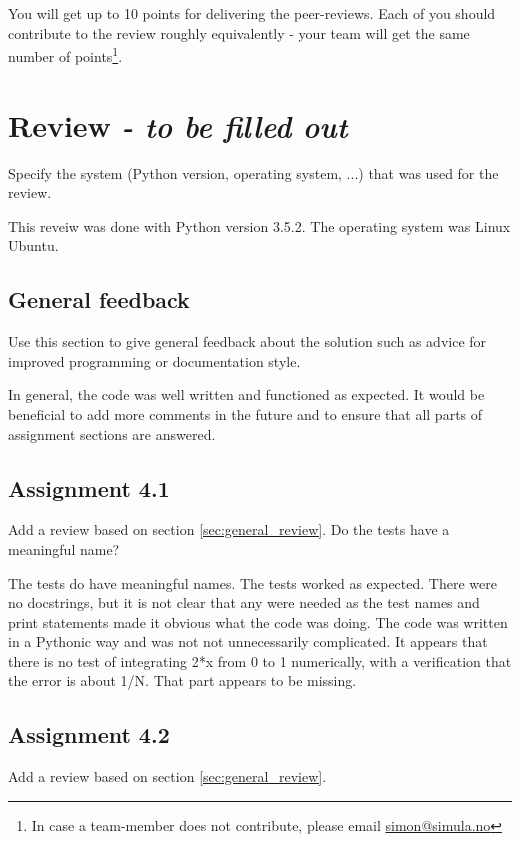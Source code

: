 \documentclass[a4paper]{article}
\begin{document}
You will get up to 10 points for delivering the peer-reviews. Each of you should contribute to the review roughly equivalently - your team will get the same number of points\footnote{In case a team-member does not contribute, please email \href{mailto:simon@simula.no}{simon@simula.no}}. 



\section{Review \emph{- to be filled out}}\label{sec:review}

Specify the system (Python version, operating system, ...) that was used for the review.
\bigskip

This reveiw was done with Python version 3.5.2. The operating system was Linux Ubuntu.
\subsection*{General feedback}
Use this section to give general feedback about the solution such as advice for improved programming or documentation style.
\bigskip

In general, the code was well written and functioned as expected. It would be beneficial to add more comments in the future and to ensure that all parts of assignment sections are answered.

\subsection*{Assignment 4.1}
Add a review based on section \ref{sec:general_review}. Do the tests have a meaningful name?
\bigskip

The tests do have meaningful names. The tests worked as expected. There were no docstrings, but it is not clear that any were needed as the test names and print statements made it obvious what the code was doing. The code was written in a Pythonic way and was not not unnecessarily complicated. It appears that there is no test of integrating 2*x from 0 to 1 numerically, with a verification that the error is about 1/N. That part appears to be missing.

\subsection*{Assignment 4.2} \label{sec:assignment5.2}
Add a review based on section \ref{sec:general_review}.
\bigskip
\end{document}
